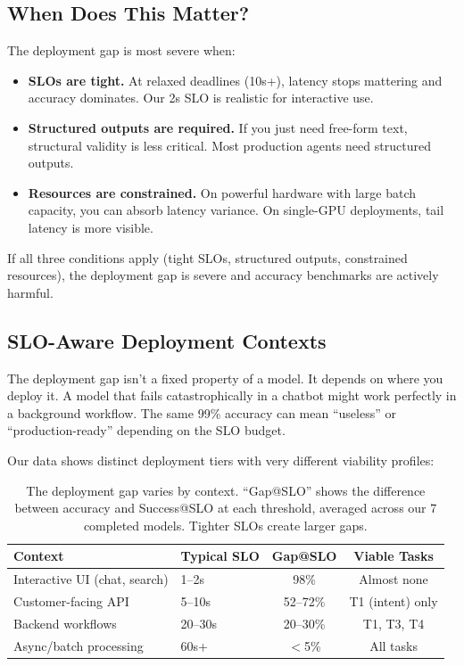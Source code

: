 \documentclass[11pt]{article}
\begin{document}
\subsection{When Does This Matter?}

The deployment gap is most severe when:
\begin{itemize}[leftmargin=12pt]
    \item \textbf{SLOs are tight.} At relaxed deadlines (10s+), latency stops mattering and accuracy dominates.  Our 2s SLO is realistic for interactive use.
    \item \textbf{Structured outputs are required.} If you just need free-form text, structural validity is less critical.  Most production agents need structured outputs.
    \item \textbf{Resources are constrained.} On powerful hardware with large batch capacity, you can absorb latency variance.  On single-GPU deployments, tail latency is more visible.
\end{itemize}

If all three conditions apply (tight SLOs, structured outputs, constrained resources), the deployment gap is severe and accuracy benchmarks are actively harmful.

\subsection{SLO-Aware Deployment Contexts}
\label{sec:slo-contexts}


The deployment gap isn't a fixed property of a model.  It depends on where you deploy it.
A model that fails catastrophically in a chatbot might work perfectly in a background workflow.
The same 99\% accuracy can mean ``useless'' or ``production-ready'' depending on the SLO budget.

Our data shows distinct deployment tiers with very different viability profiles:

\begin{table}[h]
\centering
\small
\begin{tabular}{llcc}
\toprule
\textbf{Context} & \textbf{Typical SLO} & \textbf{Gap@SLO} & \textbf{Viable Tasks} \\
\midrule
Interactive UI (chat, search) & 1--2s & 98\% & Almost none \\
Customer-facing API & 5--10s & 52--72\% & T1 (intent) only \\
Backend workflows & 20--30s & 20--30\% & T1, T3, T4 \\
Async/batch processing & 60s+ & $<$5\% & All tasks \\
\bottomrule
\end{tabular}
\caption{The deployment gap varies by context. ``Gap@SLO'' shows the difference between accuracy and Success@SLO at each threshold, averaged across our 7 completed models.  Tighter SLOs create larger gaps.}
\label{tab:slo-contexts}
\end{table}
\end{document}
